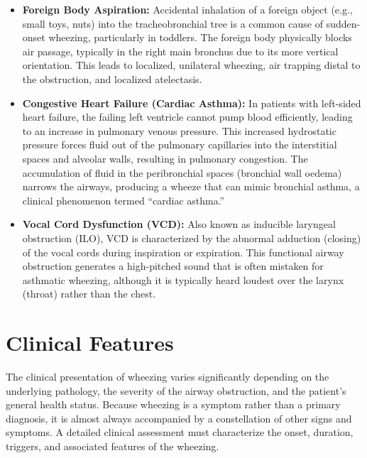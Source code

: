 \begin{itemize}
    \item \textbf{Foreign Body Aspiration:} Accidental inhalation of a foreign object (e.g., small toys, nuts) into the tracheobronchial tree is a common cause of sudden-onset wheezing, particularly in toddlers. The foreign body physically blocks air passage, typically in the right main bronchus due to its more vertical orientation. This leads to localized, unilateral wheezing, air trapping distal to the obstruction, and localized atelectasis.
    \item \textbf{Congestive Heart Failure (Cardiac Asthma):} In patients with left-sided heart failure, the failing left ventricle cannot pump blood efficiently, leading to an increase in pulmonary venous pressure. This increased hydrostatic pressure forces fluid out of the pulmonary capillaries into the interstitial spaces and alveolar walls, resulting in pulmonary congestion. The accumulation of fluid in the peribronchial spaces (bronchial wall oedema) narrows the airways, producing a wheeze that can mimic bronchial asthma, a clinical phenomenon termed ``cardiac asthma.''
    \item \textbf{Vocal Cord Dysfunction (VCD):} Also known as inducible laryngeal obstruction (ILO), VCD is characterized by the abnormal adduction (closing) of the vocal cords during inspiration or expiration. This functional airway obstruction generates a high-pitched sound that is often mistaken for asthmatic wheezing, although it is typically heard loudest over the larynx (throat) rather than the chest.
\end{itemize}

\section*{Clinical Features}
The clinical presentation of wheezing varies significantly depending on the underlying pathology, the severity of the airway obstruction, and the patient's general health status. Because wheezing is a symptom rather than a primary diagnosis, it is almost always accompanied by a constellation of other signs and symptoms. A detailed clinical assessment must characterize the onset, duration, triggers, and associated features of the wheezing.

